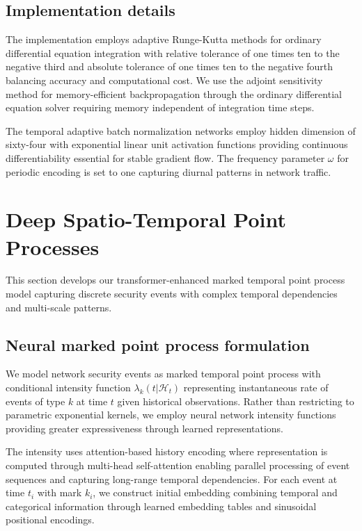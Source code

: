 \documentclass[10pt,journal,compsoc]{IEEEtran}
\begin{document}
\subsection{Implementation details}

The implementation employs adaptive Runge-Kutta methods for ordinary differential equation integration with relative tolerance of one times ten to the negative third and absolute tolerance of one times ten to the negative fourth balancing accuracy and computational cost. We use the adjoint sensitivity method for memory-efficient backpropagation through the ordinary differential equation solver requiring memory independent of integration time steps.

The temporal adaptive batch normalization networks employ hidden dimension of sixty-four with exponential linear unit activation functions providing continuous differentiability essential for stable gradient flow. The frequency parameter $\omega$ for periodic encoding is set to one capturing diurnal patterns in network traffic.

\section{Deep Spatio-Temporal Point Processes}
\label{sec:point_processes}

This section develops our transformer-enhanced marked temporal point process model capturing discrete security events with complex temporal dependencies and multi-scale patterns.

\subsection{Neural marked point process formulation}

We model network security events as marked temporal point process with conditional intensity function $\lambda_k(t | \mathcal{H}_t)$ representing instantaneous rate of events of type $k$ at time $t$ given historical observations. Rather than restricting to parametric exponential kernels, we employ neural network intensity functions providing greater expressiveness through learned representations.

The intensity uses attention-based history encoding where representation is computed through multi-head self-attention enabling parallel processing of event sequences and capturing long-range temporal dependencies. For each event at time $t_i$ with mark $k_i$, we construct initial embedding combining temporal and categorical information through learned embedding tables and sinusoidal positional encodings.
\end{document}
